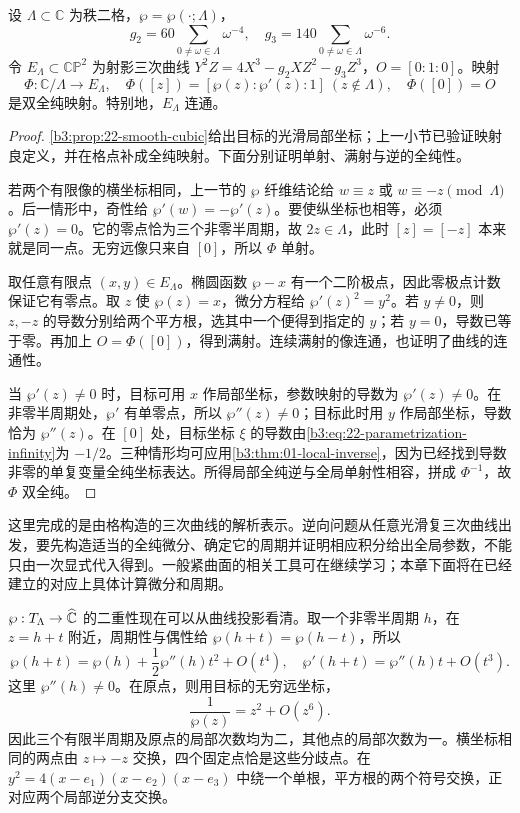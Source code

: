 \begin{theorem}[格三次曲线的解析表示]\label{b3:thm:22-uniformization}
设 \(\Lambda\subset\mathbb C\) 为秩二格，\(\wp=\wp(\cdot;\Lambda)\)，
\[
 g_2=60\sum_{0\ne\omega\in\Lambda}\omega^{-4},\quad
 g_3=140\sum_{0\ne\omega\in\Lambda}\omega^{-6}.
\]
令 \(E_\Lambda\subset\mathbb{CP}^2\) 为射影三次曲线
\(Y^2Z=4X^3-g_2XZ^2-g_3Z^3\)，\(O=[0:1:0]\)。映射
\[
 \Phi:\mathbb C/\Lambda\longrightarrow E_\Lambda,\quad
 \Phi([z])=[\wp(z):\wp'(z):1]\ (z\notin\Lambda),\quad
 \Phi([0])=O
\]
是双全纯映射。特别地，\(E_\Lambda\) 连通。
\end{theorem}
\begin{proof}
\cref{b3:prop:22-smooth-cubic}给出目标的光滑局部坐标；上一小节已验证映射良定义，并在格点补成全纯映射。下面分别证明单射、满射与逆的全纯性。

若两个有限像的横坐标相同，上一节的 \(\wp\) 纤维结论给 \(w\equiv z\) 或 \(w\equiv-z\pmod\Lambda\)。后一情形中，奇性给 \(\wp'(w)=-\wp'(z)\)。要使纵坐标也相等，必须 \(\wp'(z)=0\)。它的零点恰为三个非零半周期，故 \(2z\in\Lambda\)，此时 \([z]=[-z]\) 本来就是同一点。无穷远像只来自 \([0]\)，所以 \(\Phi\) 单射。

取任意有限点 \((x,y)\in E_\Lambda\)。椭圆函数 \(\wp-x\) 有一个二阶极点，因此零极点计数保证它有零点。取 \(z\) 使 \(\wp(z)=x\)，微分方程给 \(\wp'(z)^2=y^2\)。若 \(y\ne0\)，则 \(z,-z\) 的导数分别给两个平方根，选其中一个便得到指定的 \(y\)；若 \(y=0\)，导数已等于零。再加上 \(O=\Phi([0])\)，得到满射。连续满射的像连通，也证明了曲线的连通性。

当 \(\wp'(z)\ne0\) 时，目标可用 \(x\) 作局部坐标，参数映射的导数为 \(\wp'(z)\ne0\)。在非零半周期处，\(\wp'\) 有单零点，所以 \(\wp''(z)\ne0\)；目标此时用 \(y\) 作局部坐标，导数恰为 \(\wp''(z)\)。在 \([0]\) 处，目标坐标 \(\xi\) 的导数由\eqref{b3:eq:22-parametrization-infinity}为 \(-1/2\)。三种情形均可应用\cref{b3:thm:01-local-inverse}，因为已经找到导数非零的单复变量全纯坐标表达。所得局部全纯逆与全局单射性相容，拼成 \(\Phi^{-1}\)，故 \(\Phi\) 双全纯。
\end{proof}

这里完成的是由格构造的三次曲线的解析表示。逆向问题从任意光滑复三次曲线出发，要先构造适当的全纯微分、确定它的周期并证明相应积分给出全局参数，不能只由一次显式代入得到。一般紧曲面的相关工具可在继续学习；本章下面将在已经建立的对应上具体计算微分和周期。

\ProseParagraphBreak

\(\wp:T_\Lambda\to\widehat{\mathbb C\kern0pt}\) 的二重性现在可以从曲线投影看清。取一个非零半周期 \(h\)，在 \(z=h+t\) 附近，周期性与偶性给 \(\wp(h+t)=\wp(h-t)\)，所以
\[
 \wp(h+t)=\wp(h)+\frac12\wp''(h)t^2+O(t^4),\quad
 \wp'(h+t)=\wp''(h)t+O(t^3).
\]
这里 \(\wp''(h)\ne0\)。在原点，则用目标的无穷远坐标，
\[
 \frac1{\wp(z)}=z^2+O(z^6).
\]
因此三个有限半周期及原点的局部次数均为二，其他点的局部次数为一。横坐标相同的两点由 \(z\mapsto-z\) 交换，四个固定点恰是这些分歧点。在 \(y^2=4(x-e_1)(x-e_2)(x-e_3)\) 中绕一个单根，平方根的两个符号交换，正对应两个局部逆分支交换。

